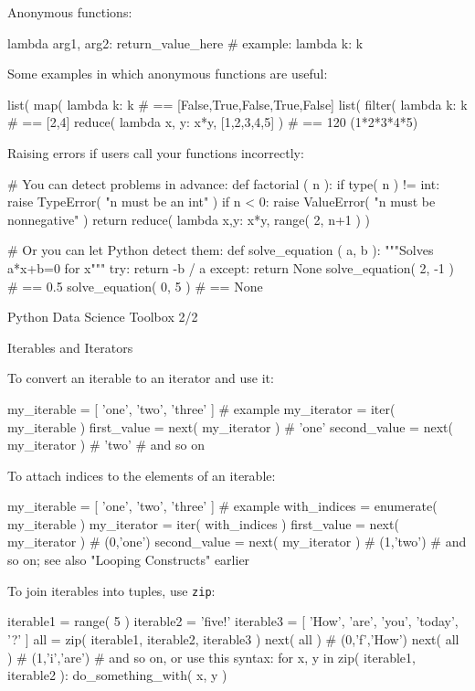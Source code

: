 \documentclass[a4paper,landscape,columns=3]{cheatsheet}
\def\chap#1{\vspace{5mm}\begin{tcolorbox}[colback=red!5!white,colframe=red!75!black,leftrule=3mm]
    \Large #1
\end{tcolorbox}}
\def\sect#1{\begin{tcolorbox}[colback=blue!5!white,colframe=blue!75!black,size=title,leftrule=2mm]
    \large #1
\end{tcolorbox}}
\begin{document}
Anonymous functions:
\begin{python}
lambda arg1, arg2: return_value_here
# example:
lambda k: k %
\end{python}

Some examples in which anonymous functions are useful:
\begin{python}
list( map( lambda k: k%
                   # == [False,True,False,True,False]
list( filter( lambda k: k%
                   # == [2,4]
reduce( lambda x, y: x*y, [1,2,3,4,5] )
                   # == 120 (1*2*3*4*5)
\end{python}

Raising errors if users call your functions incorrectly:
\begin{python}
# You can detect problems in advance:
def factorial ( n ):
    if type( n ) != int:
        raise TypeError( "n must be an int" )
    if n < 0:
        raise ValueError( "n must be nonnegative" )
    return reduce( lambda x,y: x*y, range( 2, n+1 ) )

# Or you can let Python detect them:
def solve_equation ( a, b ):
    """Solves a*x+b=0 for x"""
    try:
        return -b / a
    except:
        return None
solve_equation( 2, -1 )    # == 0.5
solve_equation( 0, 5 )     # == None
\end{python}

\chap{Python Data Science Toolbox 2/2}

\sect{Iterables and Iterators}

To convert an iterable to an iterator and use it:
\begin{python}
my_iterable = [ 'one', 'two', 'three' ]  # example
my_iterator = iter( my_iterable )
first_value = next( my_iterator )        # 'one'
second_value = next( my_iterator )       # 'two'
# and so on
\end{python}

To attach indices to the elements of an iterable:
\begin{python}
my_iterable = [ 'one', 'two', 'three' ]  # example
with_indices = enumerate( my_iterable )
my_iterator = iter( with_indices )
first_value = next( my_iterator )        # (0,'one')
second_value = next( my_iterator )       # (1,'two')
# and so on; see also "Looping Constructs" earlier
\end{python}

To join iterables into tuples, use \lstinline{zip}:
\begin{python}
iterable1 = range( 5 )
iterable2 = 'five!'
iterable3 = [ 'How', 'are', 'you', 'today', '?' ]
all = zip( iterable1, iterable2, iterable3 )
next( all )     # (0,'f','How')
next( all )     # (1,'i','are')
# and so on, or use this syntax:
for x, y in zip( iterable1, iterable2 ):
    do_something_with( x, y )
\end{python}
\end{document}
